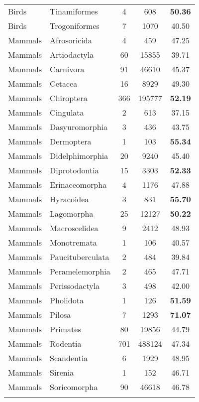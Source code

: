 \begin{longtable}{llccc}
  Birds & Tinamiformes &   4 & 608 & \textbf{50.36} \\ 
  Birds & Trogoniformes &   7 & 1070 & 40.50 \\ 
  Mammals & Afrosoricida &   4 & 459 & 47.25 \\ 
  Mammals & Artiodactyla &  60 & 15855 & 39.71 \\ 
  Mammals & Carnivora &  91 & 46610 & 45.37 \\ 
  Mammals & Cetacea &  16 & 8929 & 49.30 \\ 
  Mammals & Chiroptera & 366 & 195777 & \textbf{52.19} \\ 
  Mammals & Cingulata &   2 & 613 & 37.15 \\ 
  Mammals & Dasyuromorphia &   3 & 436 & 43.75 \\ 
  Mammals & Dermoptera &   1 & 103 & \textbf{55.34} \\ 
  Mammals & Didelphimorphia &  20 & 9240 & 45.40 \\ 
  Mammals & Diprotodontia &  15 & 3303 & \textbf{52.33} \\ 
  Mammals & Erinaceomorpha &   4 & 1176 & 47.88 \\ 
  Mammals & Hyracoidea &   3 & 831 & \textbf{55.70} \\ 
  Mammals & Lagomorpha &  25 & 12127 & \textbf{50.22} \\ 
  Mammals & Macroscelidea &   9 & 2412 & 48.93 \\ 
  Mammals & Monotremata &   1 & 106 & 40.57 \\ 
  Mammals & Paucituberculata &   2 & 484 & 39.84 \\ 
  Mammals & Peramelemorphia &   2 & 465 & 47.71 \\ 
  Mammals & Perissodactyla &   3 & 498 & 42.00 \\ 
  Mammals & Pholidota &   1 & 126 & \textbf{51.59} \\ 
  Mammals & Pilosa &   7 & 1293 & \textbf{71.07} \\ 
  Mammals & Primates &  80 & 19856 & 44.79 \\ 
  Mammals & Rodentia & 701 & 488124 & 47.34 \\ 
  Mammals & Scandentia &   6 & 1929 & 48.95 \\ 
  Mammals & Sirenia &   1 & 152 & 46.71 \\ 
  Mammals & Soricomorpha &  90 & 46618 & 46.78 \\ 
\hline
\label{table-orders}
\end{longtable}
